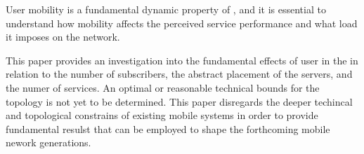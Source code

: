 User mobility is a fundamental dynamic property of \xcloud, and it is essential to understand how \ue mobility affects the perceived service performance and what load it imposes on the network. 

This paper provides an investigation into the fundamental effects of user \ue in the \xcloud in relation to the number of subscribers, the abstract placement of the servers, and the numer of services. An optimal or reasonable technical bounds for the \xcloud topology is not yet to be determined. This paper disregards the deeper techincal and topological constrains of existing mobile systems in order to provide fundamental resulst that can be employed to shape the forthcoming mobile nework generations.

